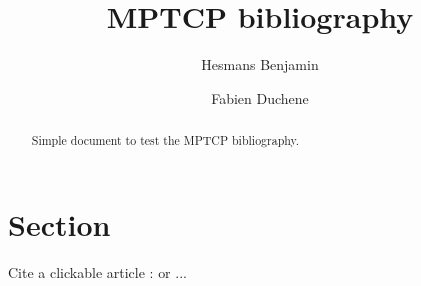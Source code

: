 \documentclass[a4paper,10pt]{article}
\title{MPTCP bibliography}
\author{Hesmans Benjamin \and Fabien Duchene}
\begin{document}
\maketitle

\begin{abstract}
Simple document to test the MPTCP bibliography.
\end{abstract}

\section{Section}

Cite a clickable article : \cite{Paasch_Mobile:2012} or \cite{login}...



\end{document}
